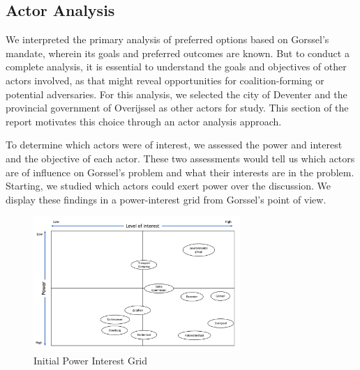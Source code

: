 \subsection{Actor Analysis}
We interpreted the primary analysis of preferred options based on Gorssel's mandate, wherein its goals and preferred outcomes are known. But to conduct a complete analysis, it is essential to understand the goals and objectives of other actors involved, as that might reveal opportunities for coalition-forming or potential adversaries. For this analysis, we selected the city of Deventer and the provincial government of Overijssel as other actors for study. This section of the report motivates this choice through an actor analysis approach. 

\bigskip

To determine which actors were of interest, we assessed the power and interest and the objective of each actor. These two assessments would tell us which actors are of influence on Gorssel's problem and what their interests are in the problem. Starting, we studied which actors could exert power over the discussion. We display these findings in a power-interest grid from Gorssel's point of view. \\

\begin{figure}[h]
    \centering
    \includegraphics[width=0.7\textwidth]{report/figures/PI grid.png}
    \caption{Initial Power Interest Grid}
    \label{fig:pi-grid}
\end{figure}



